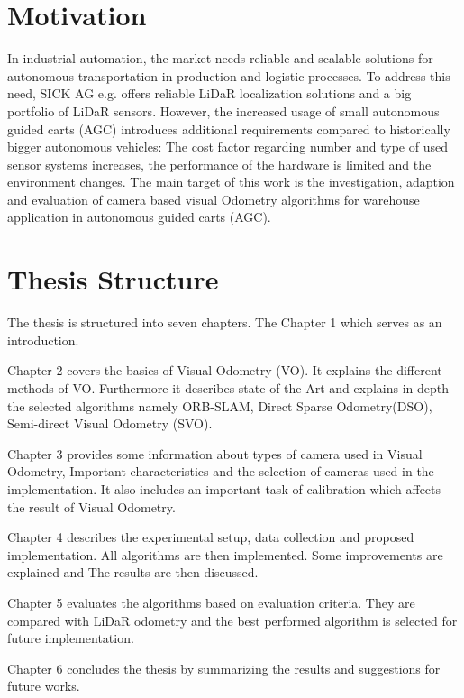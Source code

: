 \section{Motivation}
In industrial automation, the market needs reliable and scalable solutions for autonomous transportation in production and logistic processes. To address this need, SICK AG e.g. offers reliable LiDaR localization solutions and a big portfolio of LiDaR sensors. However, the increased usage of small autonomous guided carts (AGC) introduces additional requirements compared to historically bigger autonomous vehicles: The cost factor regarding number and type of used sensor systems increases, the performance of the hardware is limited
and the environment changes. The main target of this work is the investigation, adaption and evaluation of camera based visual Odometry algorithms for warehouse application in autonomous guided carts (AGC).

\section{Thesis Structure}

The thesis is structured into seven chapters. The Chapter 1 which serves as an introduction.

Chapter 2 covers the basics of Visual Odometry (VO). It explains the different methods of VO. Furthermore it describes state-of-the-Art and explains in depth the selected  algorithms namely ORB-SLAM, Direct Sparse Odometry(DSO), Semi-direct Visual Odometry (SVO).  

Chapter 3 provides some information about types of camera used in Visual Odometry, Important characteristics and the selection of cameras used in the implementation. It also includes an important task of calibration which affects the result of Visual Odometry.

Chapter 4 describes the experimental setup, data collection and proposed implementation. All algorithms are then implemented. Some improvements are explained and The results are then discussed.

Chapter 5 evaluates the algorithms based on evaluation criteria. They are compared with LiDaR odometry and the best performed algorithm is selected for future implementation.

Chapter 6 concludes the thesis by summarizing the results and suggestions for future works.